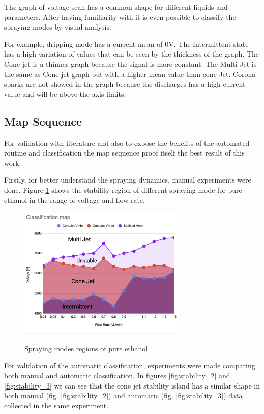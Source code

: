 The graph of voltage scan has a common shape for different liquids and parameters. After having familiarity with it is even possible to classify the spraying modes by visual analysis. 

For example, dripping mode has a current mean of 0V. The Intermittent state has a high variation of values that can be seen by the thickness of the graph. The Cone jet is a thinner graph because the signal is more constant. The Multi Jet is the same as Cone jet graph but with a higher mean value than cone Jet. Corona sparks are not showed in the graph because the discharges has a high current value and will be above the axis limits.



\subsection{Map Sequence}
\label{subsec:map_results}

For validation with literature and also to expose the benefits of the automated routine and classification the map sequence proof itself the best result of this work.



    Firstly, for better understand the spraying dynamics, manual experiments were done.
    Figure \ref{fig:stability_1} shows the stability region of different spraying mode for pure ethanol in the range of voltage and flow rate.

    \begin{figure}[H]
        \center
        \includegraphics[width=8cm]{Figuras/regions.png}
        \label{fig:stability_1}
        \caption{Spraying modes regions of pure ethanol}
    \end{figure}


    For validation of the automatic classification, experiments were made comparing both manual and automatic classification.
    In figures \ref{fig:stability_2} and \ref{fig:stability_3} we can see that the cone jet stability island has a similar shape in both manual (fig. \ref{fig:stability_2}) and automatic (fig. \ref{fig:stability_3}) data collected in the same experiment.

